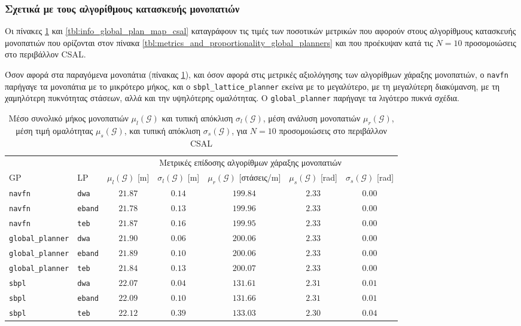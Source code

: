 \subsubsection{Σχετικά με τους αλγορίθμους κατασκευής μονοπατιών}

Οι πίνακες \ref{tbl:info_global_plan_csal} και
\ref{tbl:info_global_plan_map_csal} καταγράφουν τις τιμές των ποσοτικών
μετρικών που αφορούν στους αλγορίθμους κατασκευής μονοπατιών που ορίζονται στον
πίνακα \ref{tbl:metrics_and_proportionality_global_planners} και που προέκυψαν
κατά τις $N = 10$ προσομοιώσεις στο περιβάλλον CSAL.

Όσον αφορά στα παραγόμενα μονοπάτια (πίνακας \ref{tbl:info_global_plan_csal}),
και όσον αφορά στις μετρικές αξιολόγησης των αλγορίθμων χάραξης
μονοπατιών, ο \texttt{navfn} παρήγαγε τα μονοπάτια με το μικρότερο μήκος, και ο
\texttt{sbpl\_lattice\_planner} εκείνα με το μεγαλύτερο, με τη
μεγαλύτερη διακύμανση, με τη χαμηλότερη πυκνότητας στάσεων, αλλά και
την υψηλότερης ομαλότητας. O \texttt{global\_planner} παρήγαγε τα λιγότερο
πυκνά σχέδια.

\begin{table}[h]
\renewcommand{\arraystretch}{1.3}
\begin{tabular}{llccccc}
& & \multicolumn{5}{c}{Μετρικές επίδοσης αλγορίθμων χάραξης μονοπατιών} \\
\cline{3-7}
GP & LP & $\mu_{l}(\bm{\mathcal{G}})$ [m] & $\sigma_{l}(\bm{\mathcal{G}})$ [m] & $\mu_r(\bm{\mathcal{G}})$ [στάσεις/m] & $\mu_{s}(\bm{\mathcal{G}})$ [rad] & $\sigma_{s}(\bm{\mathcal{G}})$ [rad] \\ \toprule
\texttt{navfn} & \texttt{dwa} & $21.87$ & $0.14$ & $199.84$ & $2.33$ & $0.00$ \\
\texttt{navfn} & \texttt{eband} & $21.78$ & $0.13$ & $199.96$ & $2.33$ & $0.00$ \\
\texttt{navfn} & \texttt{teb} & $21.87$ & $0.16$ & $199.95$ & $2.33$ & $0.00$ \\
\texttt{global\_planner} & \texttt{dwa} & $21.90$ & $0.06$ & $200.06$ & $2.33$ & $0.00$ \\
\texttt{global\_planner} & \texttt{eband} & $21.89$ & $0.10$ & $200.06$ & $2.33$ & $0.00$ \\
\texttt{global\_planner} & \texttt{teb} & $21.84$ & $0.13$ & $200.07$ & $2.33$ & $0.00$ \\
\texttt{sbpl} & \texttt{dwa} & $22.07$ & $0.04$ & $131.61$ & $2.31$ & $0.01$ \\
\texttt{sbpl} & \texttt{eband} & $22.09$ & $0.10$ & $131.66$ & $2.31$ & $0.01$ \\
\texttt{sbpl} & \texttt{teb} & $22.12$ & $0.39$ & $133.03$ & $2.30$ & $0.04$ \\ \bottomrule
\end{tabular}
\caption{\small Μέσο συνολικό μήκος μονοπατιών $\mu_{l}(\bm{\mathcal{G}})$ και
         τυπική απόκλιση $\sigma_{l}(\bm{\mathcal{G}})$, μέση ανάλυση
         μονοπατιών $\mu_r(\bm{\mathcal{G}})$, μέση τιμή ομαλότητας
         $\mu_{s}(\bm{\mathcal{G}})$, και τυπική απόκλιση
         $\sigma_{s}(\bm{\mathcal{G}})$, για $N=10$ προσομοιώσεις στο
         περιβάλλον CSAL}
\label{tbl:info_global_plan_csal}
\end{table}

